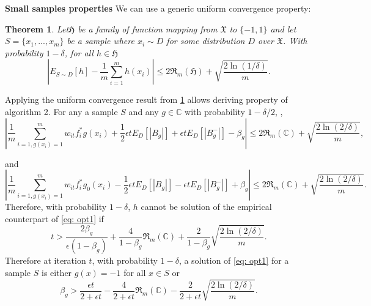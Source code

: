 \documentclass{article}
\newtheorem{thm}{Theorem}[section]
\begin{document}
\bigskip
\textbf{Small samples properties}
We can use a generic uniform convergence property: 

\begin{thm}
\label{thm1}
Let$\mathfrak{H}$ be a family of function  mapping from $\mathfrak{X}$ to $\{-1, 1\}$ and let $S=\{x_{1}, ..., x_{m}\}$ be a sample where $x_{i}\sim D$ for some distribution $D$ over $\mathfrak{X}$. With probability $1-\delta$, for all $h\in \mathfrak{H}$
$$  \left|E_{S\sim D}[h]- \frac{1}{m}\displaystyle\sum_{i=1}^{m} h(x_{i})\right| \leq 2\mathfrak{R}_{m}(\mathfrak{H}) + \sqrt{\frac{2\ln(1/\delta)}{m}}.$$
\end{thm}

Applying the uniform convergence result from \ref{thm1} allows deriving property of algorithm 2. For any a sample $S$ and any $g\in \mathbb{C}$ with probability $1-\delta/2$, ,
\begin{equation}
    \left|\frac{1}{m}\displaystyle\sum_{i=1, g(x_{i})=1}^{m} w_{it}f_{i}^{*}g(x_{i}) + \frac{1}{2}\epsilon t E_{D}[|B_{g}|] +
   \epsilon t  E_{D}[|B_{g}^{-}|] - \beta_{g}\right| \leq 2\mathfrak{R}_{m}(\mathfrak{\mathbb{C}}) + \sqrt{\frac{2\ln(2/\delta)}{m}},
\end{equation}

and 
\begin{equation}
    \left|\frac{1}{m}\displaystyle\sum_{i=1, g(x_{i})=1}^{m} w_{it}f_{i}^{*}g_{0}(x_{i}) - \frac{1}{2}\epsilon t E_{D}[|B_{g}|] -
   \epsilon t  E_{D}[|B_{g}^{-}|] + \beta_{g}\right| \leq 2\mathfrak{R}_{m}(\mathfrak{\mathbb{C}}) + \sqrt{\frac{2\ln(2/\delta)}{m}}.
\end{equation}
Therefore, with probability $1-\delta$, $h$ cannot be solution of the empirical counterpart of \eqref{eq: opt1} if 
\begin{equation}
     t > \frac{2\beta_{g}}{\epsilon(1-\beta_{g})} + \frac{4}{1-\beta_{g}}\mathfrak{R}_{m}(\mathfrak{\mathbb{C}}) + \frac{2}{1-\beta_{g}}\sqrt{\frac{2\ln(2/\delta)}{m}}.
\end{equation}
Therefore at iteration $t$, with probability $1-\delta$, a solution of \eqref{eq: opt1} for a sample $S$ is either $g(x)=-1$ for all $x\in S$ or 
\begin{equation}
    \beta_{g} > \frac{\epsilon t}{2 + \epsilon t} - \frac{4}{2 + \epsilon t}\mathfrak{R}_{m}(\mathfrak{\mathbb{C}}) - \frac{2}{2 + \epsilon t}\sqrt{\frac{2\ln(2/\delta)}{m}}.
\end{equation}



\end{document}
